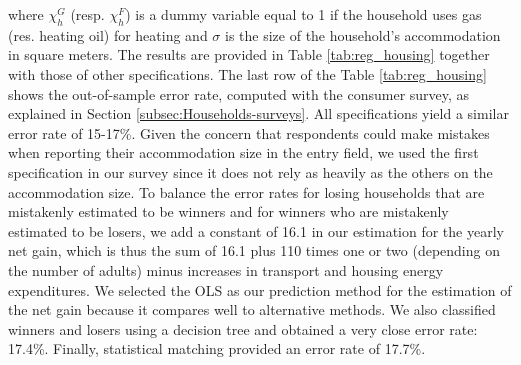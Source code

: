 \documentclass[12pt]{article} %
\begin{document}
\begin{appendices}
\noindent
where $\chi^G_h$ (resp. $\chi^F_h$) is a dummy variable equal to 1 if the household uses gas (res. heating oil) for heating and $\sigma$ is the size of the household's accommodation in square meters. The results are provided in Table \ref{tab:reg_housing} together with those of other specifications. The last row of the Table \ref{tab:reg_housing} shows the out-of-sample error rate, computed with the consumer survey, as explained in Section \ref{subsec:Households-surveys}. All specifications yield a similar error rate of 15-17\%. Given the concern that respondents could make mistakes when reporting their accommodation size in the entry field, we used the first specification in our survey since it does not rely as heavily as the others on the accommodation size. To balance the error rates for losing households that are mistakenly estimated to be winners and for winners who are mistakenly estimated to be losers, we add a constant of 16.1 in our estimation for the yearly net gain, which is thus the sum of 16.1 plus 110 times one or two (depending on the number of adults) minus increases in transport and housing energy expenditures. We selected the OLS as our prediction method for the estimation of the net gain because it compares well to alternative methods. We also classified winners and losers using a decision tree and obtained a very close error rate: 17.4\%. Finally, statistical matching provided an error rate of 17.7\%.





\end{appendices}
\end{document}
